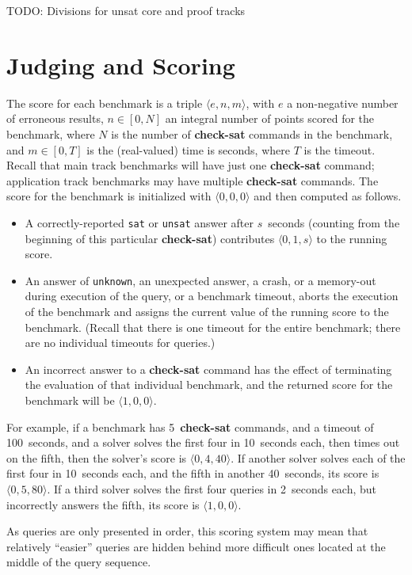 \documentclass[12pt]{article}
\newcommand{\akey}[1]{\textbf{#1}}
\begin{document}
TODO: Divisions for unsat core and proof tracks

\section{Judging and Scoring}
\label{sec:judging}

The score for each benchmark is a triple $\langle e,n,m\rangle$, with
$e$ a non-negative number of erroneous results,
$n\in[0,N]$ an integral number of points scored for the benchmark,
where $N$ is the number of \akey{check-sat} commands
in the benchmark, and $m\in[0,T]$ is the (real-valued) time is seconds, where $T$ is
the timeout.  Recall that main track benchmarks will have just one \akey{check-sat} command;
application track benchmarks may have multiple \akey{check-sat} commands.
The score for the benchmark is initialized with
$\langle0,0,0\rangle$ and then computed as follows.
\begin{itemize}
\item A correctly-reported \texttt{sat} or \texttt{unsat} answer after
  $s$~seconds (counting from the beginning of this particular
  \akey{check-sat}) contributes $\langle0,1,s\rangle$ to the running
  score.
\item An answer of \texttt{unknown}, an unexpected answer, a crash, or a memory-out during
  execution of the query, or a benchmark timeout, aborts the execution
  of the benchmark and assigns the current value of the running score
  to the benchmark.  (Recall that there is one timeout for the entire
  benchmark; there are no individual timeouts for queries.)
\item An incorrect answer to a \akey{check-sat} command has the effect of terminating the
  evaluation of that individual benchmark, and the returned score for the benchmark
  will be $\langle1,0,0\rangle$.
\end{itemize}


For example, if a benchmark has 5~\akey{check-sat} commands, and a
timeout of 100~seconds, and a solver solves the first four in
10~seconds each, then times out on the fifth, then the solver's score
is $\langle0,4,40\rangle$.  If another solver solves each of the first
four in 10~seconds each, and the fifth in another 40~seconds, its
score is $\langle0,5,80\rangle$.  If a third solver solves the first
four queries in 2~seconds each, but incorrectly answers the fifth, its
score is $\langle1,0,0\rangle$.

As queries are only presented in order, this scoring system may mean
that relatively ``easier'' queries are hidden behind more difficult
ones located at the middle of the query sequence.
\end{document}
